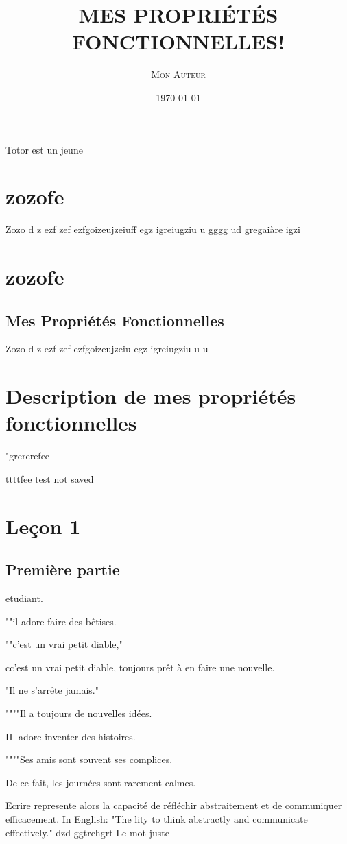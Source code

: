 \documentclass{article}
\title{\MakeUppercase{\textsc{Mes Propriétés Fonctionnelles!}}}
\author{\textsc{Mon Auteur}}
\date{\today}
\begin{document}
\maketitle

Totor est un jeune

\section{zozofe}

Zozo d
z
ezf
zef
ezfgoizeujzeiuff
egz
igreiugziu
u
gggg
ud
gregaiàre
igzi


\section{zozofe} \subsection{Mes Propriétés Fonctionnelles} Zozo d z ezf zef ezfgoizeujzeiu egz igreiugziu u u \section{Description de mes propriétés fonctionnelles}"grererefee

ttttfee
test
not saved

\section{Leçon 1} \subsection{Première partie}

etudiant.

""il adore faire des bêtises.

""c'est un vrai petit diable,"

cc'est un vrai petit diable, toujours prêt à en faire une nouvelle.

"Il ne s'arrête jamais."

""""Il a toujours de nouvelles idées.

IIl adore inventer des histoires.

""""Ses amis sont souvent ses complices.

De ce fait, les journées sont rarement calmes.



Ecrire represente alors la capacité de réfléchir abstraitement et de communiquer efficacement. In English: "The lity to think abstractly and communicate effectively." dzd ggtrehgrt
Le mot juste	
\end{document}
